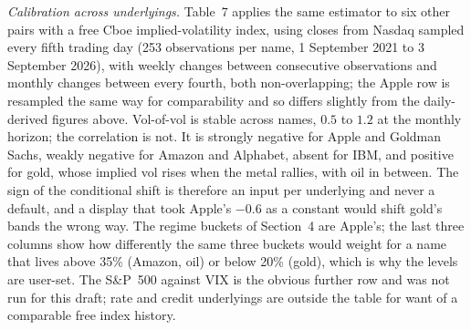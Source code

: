 \documentclass[11pt,a4paper]{article}
\begin{document}
\emph{Calibration across underlyings.} Table~7 applies the same estimator to six other pairs with a free Cboe implied-volatility index, using closes from Nasdaq sampled every fifth trading day (253 observations per name, 1 September 2021 to 3 September 2026), with weekly changes between consecutive observations and monthly changes between every fourth, both non-overlapping; the Apple row is resampled the same way for comparability and so differs slightly from the daily-derived figures above. Vol-of-vol is stable across names, $0.5$ to $1.2$ at the monthly horizon; the correlation is not. It is strongly negative for Apple and Goldman Sachs, weakly negative for Amazon and Alphabet, absent for IBM, and positive for gold, whose implied vol rises when the metal rallies, with oil in between. The sign of the conditional shift is therefore an input per underlying and never a default, and a display that took Apple's $-0.6$ as a constant would shift gold's bands the wrong way. The regime buckets of Section~4 are Apple's; the last three columns show how differently the same three buckets would weight for a name that lives above 35\% (Amazon, oil) or below 20\% (gold), which is why the levels are user-set. The S\&P~500 against VIX is the obvious further row and was not run for this draft; rate and credit underlyings are outside the table for want of a comparable free index history.
\end{document}
